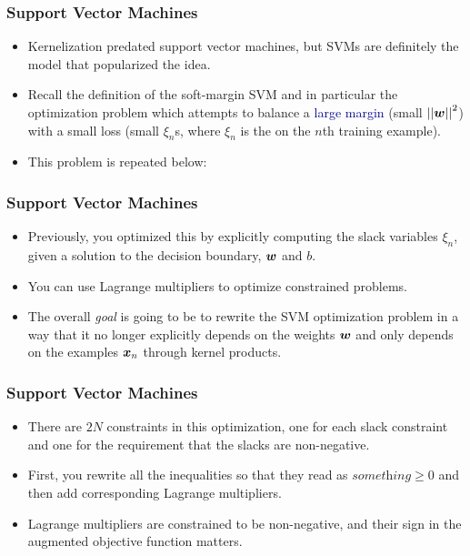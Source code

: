 \documentclass[trans]{beamer}
\begin{document}
\begin{frame}
  \frametitle{Support Vector Machines}
\begin{itemize}
\item 
Kernelization predated support vector machines, but SVMs are
definitely the model that popularized the idea.
\item   Recall the definition
of the soft-margin SVM and in
particular the optimization problem which
attempts to balance a \textcolor{darkblue}{large margin} (small
$\left\vert\left\vert {\boldsymbol{w}} \right\vert\right\vert^2$) with a \textcolor{darkergreen}{small loss} (small
$\xi_n$s, where $\xi_n$ is the  on the $n$th training
example).  
\item This problem is repeated below:
%
\end{itemize}
\end{frame}

\begin{frame}
  \frametitle{Support Vector Machines}
\begin{itemize}
\item 
%
Previously, you optimized this by explicitly computing the slack
variables $\xi_n$, given a solution to the decision boundary, ${\boldsymbol{w}}$
and $b$.
\item  You can use Lagrange
multipliers to optimize constrained problems. 
\item The overall \emph{goal}
is going to be to rewrite the SVM optimization problem in a way that
it no longer explicitly depends on the weights ${\boldsymbol{w}}$ and only depends
on the examples ${\boldsymbol{x}}_n$ through kernel products.
\end{itemize}
\end{frame}

\begin{frame}
  \frametitle{Support Vector Machines}
\begin{itemize}
\item 
There are $2N$ constraints in this optimization, one for each slack
constraint and one for the requirement that the slacks are
non-negative.
\item
First, you rewrite all the inequalities so that they read as
$\textit{something} \geq 0$ and then add corresponding Lagrange
multipliers.
\item   Lagrange multipliers are
constrained to be non-negative, and their sign in the augmented
objective function matters.
\end{itemize}
\end{frame}
\end{document}
